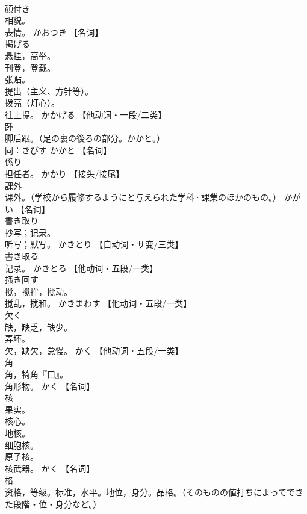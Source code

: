 \documentclass[8pt]{extreport}
\begin{document}
\begin{CJK}{UTF8}{min}
\\	顔付き	
\\	相貌。 
\\	表情。	かおつき		【名词】
\\	掲げる	
\\	悬挂，高举。 
\\	刊登，登载。 
\\	张贴。 
\\	提出（主义、方针等）。 
\\	拨亮（灯心）。 
\\	往上提。	かかげる		【他动词・一段/二类】
\\	踵	
\\	脚后跟。（足の裏の後ろの部分。かかと。） 
\\	同：きびす	かかと		【名词】
\\	係り	
\\	担任者。	かかり		【接头/接尾】
\\	課外	
\\	课外。（学校から履修するようにと与えられた学科·課業のほかのもの。）	かがい		【名词】
\\	書き取り	
\\	抄写；记录。 
\\	听写；默写。	かきとり		【自动词・サ变/三类】
\\	書き取る	
\\	记录。	かきとる		【他动词・五段/一类】
\\	掻き回す	
\\	搅，搅拌，搅动。 
\\	搅乱，搅和。	かきまわす		【他动词・五段/一类】
\\	欠く	
\\	缺，缺乏，缺少。 
\\	弄坏。 
\\	欠，缺欠，怠慢。	かく		【他动词・五段/一类】
\\	角	
\\	角，犄角『口』。 
\\	角形物。	かく		【名词】
\\	核	
\\	果实。 
\\	核心。 
\\	地核。 
\\	细胞核。 
\\	原子核。 
\\	核武器。	かく		【名词】
\\	格	
\\	资格，等级。标准，水平。地位，身分。品格。（そのものの値打ちによってできた段階・位・身分など。） 

\end{CJK}
\end{document}

